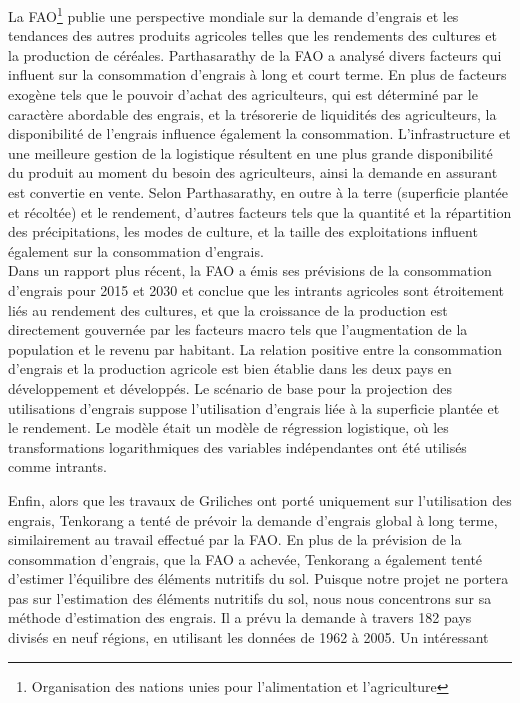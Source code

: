La FAO\footnote{Organisation des nations unies pour l'alimentation et l'agriculture} publie une perspective mondiale sur la demande d'engrais et les tendances des autres produits agricoles telles que les rendements des cultures et la production de céréales. Parthasarathy\cite{PAR94} de la FAO a analysé divers facteurs qui influent sur la consommation d'engrais à long et court terme. En plus de facteurs exogène tels que le pouvoir d'achat des agriculteurs, qui est déterminé par le caractère abordable des engrais, et la trésorerie de liquidités des agriculteurs, la disponibilité de l'engrais influence également la consommation. L'infrastructure et une meilleure gestion de la logistique résultent en une plus grande disponibilité du produit au moment du besoin des agriculteurs, ainsi la demande en assurant est convertie en vente. Selon Parthasarathy, en outre à la terre (superficie plantée et récoltée) et le rendement, d'autres facteurs tels que la quantité et la répartition des précipitations, les modes de culture, et la taille des exploitations influent également sur la consommation d'engrais.\\
Dans un rapport plus récent, la FAO a émis ses prévisions de la consommation d'engrais pour 2015 et 2030 et conclue que les intrants agricoles sont étroitement liés au rendement des cultures, et que la croissance de la production est directement gouvernée par les facteurs macro tels que l'augmentation de la population et le revenu par habitant.
La relation positive entre la consommation d'engrais et la production agricole est bien
établie dans les deux pays en développement et développés. Le scénario de base pour la projection des utilisations d'engrais suppose l'utilisation d'engrais liée à la superficie plantée et le rendement. Le modèle était un modèle de régression logistique, où les transformations logarithmiques des variables indépendantes ont été utilisés comme intrants\cite{FAO2000}.\par
Enfin, alors que les travaux de Griliches \cite{Zvi58} ont porté uniquement sur l'utilisation des engrais, Tenkorang \cite{Tenk06} a tenté de prévoir la demande d'engrais global à long terme, similairement au travail effectué par la
FAO. En plus de la prévision de la consommation d'engrais, que la FAO a achevée, Tenkorang a également tenté d'estimer l'équilibre des éléments nutritifs du sol. Puisque notre projet ne portera pas sur l'estimation des éléments nutritifs du sol, nous nous concentrons sur sa méthode d'estimation des engrais. Il a prévu la demande à travers 182 pays divisés en neuf régions, en utilisant les données de 1962 à 2005. Un intéressant

